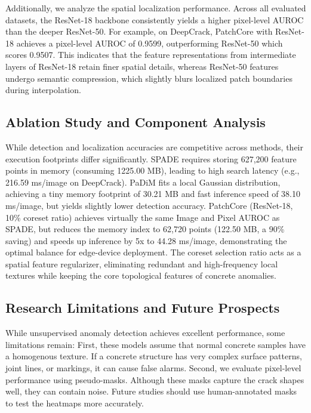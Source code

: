 \documentclass[runningheads]{llncs}
\begin{document}
Additionally, we analyze the spatial localization performance. Across all evaluated datasets, the ResNet-18 backbone consistently yields a higher pixel-level AUROC than the deeper ResNet-50. For example, on DeepCrack, PatchCore with ResNet-18 achieves a pixel-level AUROC of 0.9599, outperforming ResNet-50 which scores 0.9507. This indicates that the feature representations from intermediate layers of ResNet-18 retain finer spatial details, whereas ResNet-50 features undergo semantic compression, which slightly blurs localized patch boundaries during interpolation.

\subsection{Ablation Study and Component Analysis}
While detection and localization accuracies are competitive across methods, their execution footprints differ significantly.
SPADE requires storing 627,200 feature points in memory (consuming 1225.00 MB), leading to high search latency (e.g., 216.59 ms/image on DeepCrack). PaDiM fits a local Gaussian distribution, achieving a tiny memory footprint of 30.21 MB and fast inference speed of 38.10 ms/image, but yields slightly lower detection accuracy.
PatchCore (ResNet-18, 10\% coreset ratio) achieves virtually the same Image and Pixel AUROC as SPADE, but reduces the memory index to 62,720 points (122.50 MB, a 90\% saving) and speeds up inference by 5x to 44.28 ms/image, demonstrating the optimal balance for edge-device deployment. The coreset selection ratio acts as a spatial feature regularizer, eliminating redundant and high-frequency local textures while keeping the core topological features of concrete anomalies.

\subsection{Research Limitations and Future Prospects}
While unsupervised anomaly detection achieves excellent performance, some limitations remain:
First, these models assume that normal concrete samples have a homogenous texture. If a concrete structure has very complex surface patterns, joint lines, or markings, it can cause false alarms. Second, we evaluate pixel-level performance using pseudo-masks. Although these masks capture the crack shapes well, they can contain noise. Future studies should use human-annotated masks to test the heatmaps more accurately.
\end{document}
